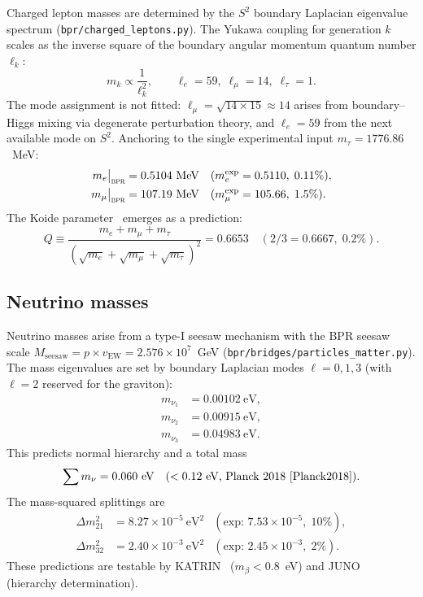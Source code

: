 \documentclass[aps,prd,twocolumn,superscriptaddress,longbibliography,nofootinbib]{revtex4-2}
\newcommand{\Stwo}{S^2}
\newcommand{\vEW}{v_{\mathrm{EW}}}
\newcommand{\bpr}{\textsc{bpr}}
\begin{document}
Charged lepton masses are determined by the $\Stwo$ boundary
Laplacian eigenvalue spectrum
(\texttt{bpr/charged\_leptons.py}).  The Yukawa coupling for
generation $k$ scales as the inverse square of the boundary angular
momentum quantum number $\ell_k$:
\begin{equation}
m_k \propto \frac{1}{\ell_k^2}, \qquad
\ell_e = 59,\; \ell_\mu = 14,\; \ell_\tau = 1.
\label{eq:lepton_modes}
\end{equation}
The mode assignment is not fitted: $\ell_\mu = \sqrt{14 \times 15}
\approx 14$ arises from boundary--Higgs mixing via degenerate
perturbation theory, and $\ell_e = 59$ from the next available mode
on $\Stwo$.  Anchoring to the single experimental input $m_\tau =
1776.86$~MeV:
\begin{align}
m_e\big|_{\bpr} &= 0.5104~\text{MeV}
  & (m_e^{\mathrm{exp}} &= 0.5110,\; 0.11\%), \nonumber \\
m_\mu\big|_{\bpr} &= 107.19~\text{MeV}
  & (m_\mu^{\mathrm{exp}} &= 105.66,\; 1.5\%).
\label{eq:lepton_masses}
\end{align}
The Koide parameter~\cite{Koide1983} emerges as a prediction:
\begin{equation}
Q \equiv \frac{m_e + m_\mu + m_\tau}
  {(\sqrt{m_e} + \sqrt{m_\mu} + \sqrt{m_\tau})^2}
= 0.6653 \quad (2/3 = 0.6667,\; 0.2\%).
\label{eq:koide}
\end{equation}

\subsection{Neutrino masses}

Neutrino masses arise from a type-I seesaw mechanism with the BPR
seesaw scale $M_{\mathrm{seesaw}} = p \times \vEW = 2.576 \times
10^7$~GeV (\texttt{bpr/bridges/particles\_matter.py}).  The mass
eigenvalues are set by boundary Laplacian modes $\ell = 0, 1, 3$
(with $\ell = 2$ reserved for the graviton):
\begin{align}
m_{\nu_1} &= 0.00102~\text{eV}, \nonumber \\
m_{\nu_2} &= 0.00915~\text{eV}, \nonumber \\
m_{\nu_3} &= 0.04983~\text{eV}.
\label{eq:neutrino_masses}
\end{align}
This predicts normal hierarchy and a total mass
\begin{equation}
\sum m_\nu = 0.060~\text{eV} \quad (< 0.12~\text{eV, Planck
2018~\cite{Planck2018}}).
\label{eq:sum_mnu}
\end{equation}
The mass-squared splittings are
\begin{align}
\Delta m^2_{21} &= 8.27 \times 10^{-5}~\text{eV}^2
  &\!\!\!(\text{exp: } 7.53 \times 10^{-5},\; 10\%), \nonumber \\
\Delta m^2_{32} &= 2.40 \times 10^{-3}~\text{eV}^2
  &\!\!\!(\text{exp: } 2.45 \times 10^{-3},\; 2\%).
\label{eq:dm2}
\end{align}
These predictions are testable by KATRIN~\cite{KATRIN2022}
($m_\beta < 0.8$~eV) and JUNO~\cite{JUNO2022} (hierarchy
determination).
\end{document}
